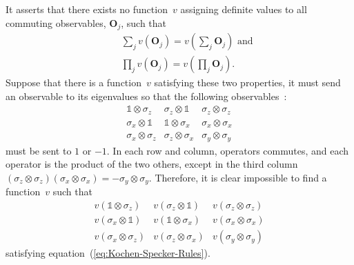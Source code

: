 \documentclass[english,reprint, aps, prl,superscriptaddress, showpacs,
showkeys, longbibliography]{revtex4-1}
\theoremstyle{plain}
\theoremstyle{definition}
\begin{document}
It asserts that there exists no function~$v$
assigning definite values to all commuting observables, $\mathbf{O}_{j}$, such that 
\begin{subequations}
\label{eq:Kochen-Specker-Rules} 
\begin{eqnarray}
 &  & \sum_{j} v\left(\mathbf{O}_{j}\right)=v\left(\sum_{j} \mathbf{O}_{j}\right)\textrm{ and}\\
 &  & \prod_{j} v\left(\mathbf{O}_{j}\right)=v\left(\prod_{j}\mathbf{O}_{j}\right) .
\end{eqnarray}
\end{subequations} 
Suppose that there is a function~$v$ satisfying
these two properties, it must send an observable to its eigenvalues
so that the following observables~\cite{Mermin1990Simple,peres1995quantum}:
\begin{equation}
\begin{array}{ccc}
\mathbb{1}\otimes\sigma_{z} & \sigma_{z}\otimes\mathbb{1} & \sigma_{z}\otimes\sigma_{z}\\
\sigma_{x}\otimes\mathbb{1} & \mathbb{1}\otimes\sigma_{x} & \sigma_{x}\otimes\sigma_{x}\\
\sigma_{x}\otimes\sigma_{z} & \sigma_{z}\otimes\sigma_{x} & \sigma_{y}\otimes\sigma_{y}
\end{array}\label{eq:MerminSquare}
\end{equation}
must be sent to $1$ or $-1$. In each row and column, operators commutes,
and each operator is the product of the two others, except in the
third column $\left(\sigma_{z}\otimes\sigma_{z}\right)\left(\sigma_{x}\otimes\sigma_{x}\right)=-\sigma_{y}\otimes\sigma_{y}$.
Therefore, it is clear impossible to find a function~$v$ such that
\begin{equation}
\begin{array}{ccc}
v\left(\mathbb{1}\otimes\sigma_{z}\right) & v\left(\sigma_{z}\otimes\mathbb{1}\right) & v\left(\sigma_{z}\otimes\sigma_{z}\right)\\
v\left(\sigma_{x}\otimes\mathbb{1}\right) & v\left(\mathbb{1}\otimes\sigma_{x}\right) & v\left(\sigma_{x}\otimes\sigma_{x}\right)\\
v\left(\sigma_{x}\otimes\sigma_{z}\right) & v\left(\sigma_{z}\otimes\sigma_{x}\right) & v\left(\sigma_{y}\otimes\sigma_{y}\right)
\end{array}\label{eq:MerminSquare-values}
\end{equation}
satisfying equation~(\ref{eq:Kochen-Specker-Rules}).
\end{document}

